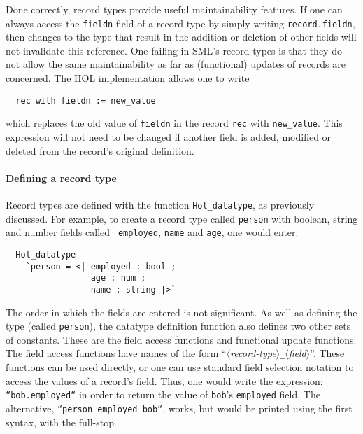 Done correctly, record types provide useful maintainability features.
If one can always access the {\tt fieldn} field of a record type by
simply writing {\tt record.fieldn}, then changes to the type that
result in the addition or deletion of other fields will not invalidate
this reference.  One failing in SML's record types is that they do not
allow the same maintainability as far as (functional) updates of
records are concerned.  The HOL implementation allows one to write
\begin{hol}
\begin{verbatim}
  rec with fieldn := new_value
\end{verbatim}
\end{hol}
which replaces the old value of {\tt fieldn} in the record {\tt rec}
with {\tt new\_value}.  This expression will not need to be changed if
another field is added, modified or deleted from the record's original
definition.

\paragraph{Defining a record type}
Record types are defined with the function \texttt{Hol\_datatype}, as
previously discussed.  For example, to create a record type called
{\tt person} with boolean, string and number fields called {\tt
  employed}, {\tt name} and {\tt age}, one would enter:
\begin{hol}
\begin{verbatim}
  Hol_datatype
    `person = <| employed : bool ;
                 age : num ;
                 name : string |>`
\end{verbatim}
\end{hol}
The order in which the fields are entered is not significant. As well
as defining the type (called {\tt person}), the datatype definition
function also defines two other sets of constants.  These are the
field access functions and functional update functions.  The field
access functions have names of the form
``$\langle$\textsl{record-type\/}$\rangle$\verb|_|$\langle$\textsl{field\/}$\rangle$''.
These functions can be used directly, or one can use standard field
selection notation to access the values of a record's field.  Thus,
one would write the expression: \mbox{\tt ``bob.employed``} in order
to return the value of {\tt bob}'s {\tt employed} field.  The
alternative, \texttt{``person\_employed bob``}, works, but would be
printed using the first syntax, with the full-stop.

